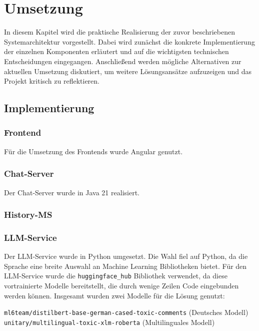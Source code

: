 \documentclass[12pt]{report}
\begin{document}
\chapter{Umsetzung}

In diesem Kapitel wird die praktische Realisierung der zuvor beschriebenen Systemarchitektur vorgestellt. Dabei wird zunächst die konkrete Implementierung der einzelnen Komponenten erläutert und auf die wichtigsten technischen Entscheidungen eingegangen. Anschließend werden mögliche Alternativen zur aktuellen Umsetzung diskutiert, um weitere Lösungsansätze aufzuzeigen und das Projekt kritisch zu reflektieren.

\section{Implementierung}

\subsection{Frontend}
Für die Umsetzung des Frontends wurde Angular genutzt.
\subsection{Chat-Server}
Der Chat-Server  wurde in Java 21 realisiert.
\subsection{History-MS}

\subsection{LLM-Service}

Der LLM-Service wurde in Python umgesetzt. Die Wahl fiel auf Python, da die Sprache eine breite Auswahl an Machine Learning Bibliotheken bietet. Für den LLM-Service wurde die \texttt{huggingface\_hub} Bibliothek verwendet, da diese vortrainierte Modelle bereitstellt, die durch wenige Zeilen Code eingebunden werden können.
\newline\newline
Insgesamt wurden zwei Modelle für die Lösung genutzt:

\begin{center}
\texttt{ml6team/distilbert-base-german-cased-toxic-comments} (Deutsches Modell) \texttt{unitary/multilingual-toxic-xlm-roberta} (Multilinguales Modell)
\end{center}
\end{document}
